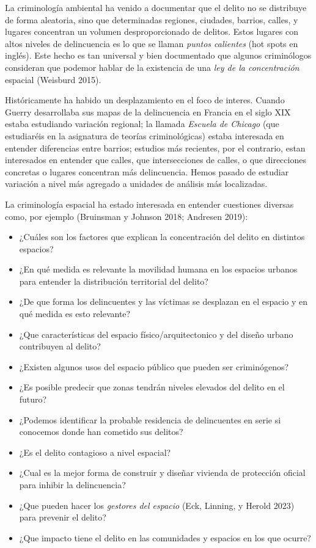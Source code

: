 \documentclass[
  spanish,
  letterpaper,
  DIV=11,
  numbers=noendperiod]{scrreprt}
\begin{document}
La criminología ambiental ha venido a documentar que el delito no se
distribuye de forma aleatoria, sino que determinadas regiones, ciudades,
barrios, calles, y lugares concentran un volumen desproporcionado de
delitos. Estos lugares con altos niveles de delincuencia es lo que se
llaman \emph{puntos calientes} (hot spots en inglés). Este hecho es tan
universal y bien documentado que algunos criminólogos consideran que
podemor hablar de la existencia de una \emph{ley de la concentración}
espacial (Weisburd 2015).

Históricamente ha habido un desplazamiento en el foco de interes. Cuando
Guerry desarrollaba sus mapas de la delincuencia en Francia en el siglo
XIX estaba estudiando variación regional; la llamada \emph{Escuela de
Chicago} (que estudiaréis en la asignatura de teorías criminológicas)
estaba interesada en entender diferencias entre barrios; estudios más
recientes, por el contrario, estan interesados en entender que calles,
que intersecciones de calles, o que direcciones concretas o lugares
concentran más delincuencia. Hemos pasado de estudiar variación a nivel
más agregado a unidades de análisis más localizadas.

La criminología espacial ha estado interesada en entender cuestiones
diversas como, por ejemplo (Bruinsman y Johnson 2018; Andresen 2019):

\begin{itemize}
\item
  ¿Cuáles son los factores que explican la concentración del delito en
  distintos espacios?
\item
  ¿En qué medida es relevante la movilidad humana en los espacios
  urbanos para entender la distribución territorial del delito?
\item
  ¿De que forma los delincuentes y las víctimas se desplazan en el
  espacio y en qué medida es esto relevante?
\item
  ¿Que características del espacio físico/arquitectonico y del diseño
  urbano contribuyen al delito?
\item
  ¿Existen algunos usos del espacio público que pueden ser criminógenos?
\item
  ¿Es posible predecir que zonas tendrán niveles elevados del delito en
  el futuro?
\item
  ¿Podemos identificar la probable residencia de delincuentes en serie
  si conocemos donde han cometido sus delitos?
\item
  ¿Es el delito contagioso a nivel espacial?
\item
  ¿Cual es la mejor forma de construir y diseñar vivienda de protección
  oficial para inhibir la delincuencia?
\item
  ¿Que pueden hacer los \emph{gestores del espacio} (Eck, Linning, y
  Herold 2023) para prevenir el delito?
\item
  ¿Que impacto tiene el delito en las comunidades y espacios en los que
  ocurre?
\end{itemize}
\end{document}
